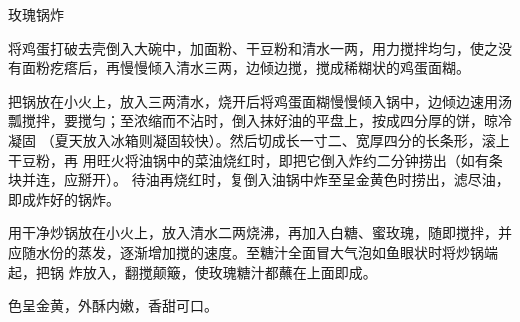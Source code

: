 \begin{recipe}{玫瑰锅炸}

\ingredients


\preparation

\step 将鸡蛋打破去壳倒入大碗中，加面粉、干豆粉和清水一两，用力搅拌均匀，使之没
有面粉疙瘩后，再慢慢倾入清水三两，边倾边搅，搅成稀糊状的鸡蛋面糊。

\step 把锅放在小火上，放入三两清水，烧开后将鸡蛋面糊慢慢倾入锅中，边倾边速用汤
瓢搅拌，要搅匀；至浓缩而不沾时，倒入抹好油的平盘上，按成四分厚的饼，晾冷凝固
（夏天放入冰箱则凝固较快）。然后切成长一寸二、宽厚四分的长条形，滚上干豆粉，再
用旺火将油锅中的菜油烧红时，即把它倒入炸约二分钟捞出（如有条块并连，应掰开）。
待油再烧红时，复倒入油锅中炸至呈金黄色时捞出，滤尽油，即成炸好的锅炸。

\step 用干净炒锅放在小火上，放入清水二两烧沸，再加入白糖、蜜玫瑰，随即搅拌，并
应随水份的蒸发，逐渐增加搅的速度。至糖汁全面冒大气泡如鱼眼状时将炒锅端起，把锅
炸放入，翻搅颠簸，使玫瑰糖汁都蘸在上面即成。

\features

色呈金黄，外酥内嫩，香甜可口。

\end{recipe}


